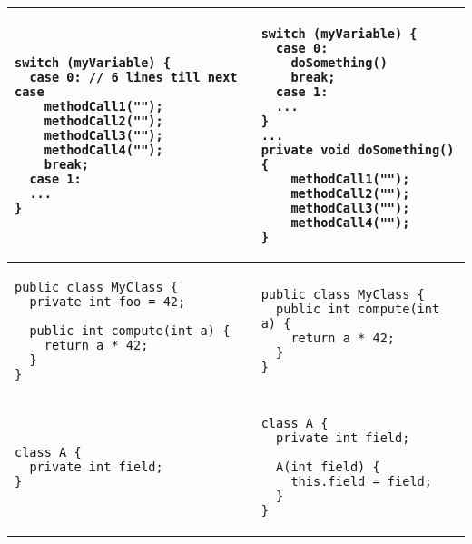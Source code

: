 \documentclass[a4paper]{article}
\begin{document}
\begin{center}
\begin{tabular}{|p{}|p{}|}
  	\hline
	\begin{lstlisting}
switch (myVariable) {
  case 0: // 6 lines till next case
    methodCall1("");
    methodCall2("");
    methodCall3("");
    methodCall4("");
    break;
  case 1:
  ...
}
  	\end{lstlisting} 
   	& 
   	\begin{lstlisting}
switch (myVariable) {
  case 0:                  
    doSomething()
    break;
  case 1:
  ...
}
...
private void doSomething(){
    methodCall1("");
    methodCall2("");
    methodCall3("");
    methodCall4("");
} 
  	\end{lstlisting}  \\
  	\hline
	\begin{lstlisting}
public class MyClass {
  private int foo = 42;

  public int compute(int a) {
    return a * 42;
  }
}
  	\end{lstlisting} 
   	& 
   	\begin{lstlisting}
public class MyClass {
  public int compute(int a) {
    return a * 42;
  }
}
  	\end{lstlisting}  \\
  	\hline
	\begin{lstlisting}
class A { 
  private int field;
}
  	\end{lstlisting} 
   	& 
   	\begin{lstlisting}
class A {
  private int field;

  A(int field) {
    this.field = field;
  }
}
  	\end{lstlisting}  \\
  	\hline
\end{tabular}  
\end{center} 
\end{document}
